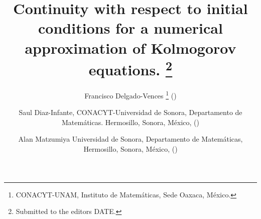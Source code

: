 \usepackage{lipsum}
\usepackage{amsfonts}
\usepackage{amsmath, amssymb}
\usepackage{graphicx}
\usepackage{epstopdf}
\usepackage{algorithmic}
\DeclareMathOperator{\sech}{sech}
\ifpdf
\else
\fi
\newcommand{\creflastconjunction}{, and~}

\title{
    Continuity with respect to initial conditions for a numerical 
    approximation of Kolmogorov equations.
    \thanks{
        Submitted to the editors DATE.
    }
}

\author{
    Francisco Delgado-Vences
    \thanks{
    CONACYT-UNAM, 
    Instituto de Matem\'aticas, 
    Sede Oaxaca, M\'exico.}
    ()
%    
    \and
    Saul Diaz-Infante,
    CONACYT-Universidad 
    de Sonora, Departamento de Matem\'aticas. 
    Hermosillo, Sonora, M\'exico,
    ()
%
    \and
    Alan Matzumiya
    Universidad de Sonora, 
    Departamento de Matem\'aticas,
    Hermosillo, Sonora, M\'exico,
    ()
    \footnotemark[3]
}

\usepackage{amsopn}
\DeclareMathOperator{\diag}{diag}

\newcommand{\cqd}{\hfill$\Box$}
\newcommand{\f}{{\mathcal F}}
\newcommand{\IR}{{\mathbb R}}
\newcommand{\R}{{\mathbb R}}
\newcommand{\IN}{{\mathbb N}}
\newcommand{\ind}{\mbox{\Large$\chi$}}
\newcommand{\tor}{{\mathbb T}}
\newcommand{\G}{{\mathbb G}}
\newcommand{\beq}{\begin{equation}}
\newcommand{\eeq}{\end{equation}}
\newcommand{\bal}{\begin{align}}
\newcommand{\eal}{\end{align}}
\newcommand{\beqn}{\begin{equation*}}
\newcommand{\eeqn}{\end{equation*}}
\newcommand{\baln}{\begin{align*}}
\newcommand{\ealn}{\end{align*}}
\newcommand{\tbar}{\bar t}
\newcommand{\xbar}{\bar x}
\newcommand{\ep}{\epsilon}
\newcommand{\Pb}{\mathbb P}
\newcommand{\Rl}{\mathbb R}
\newcommand{\E}{\mathbb{E}}
\newcommand{\tf}{\mathcal{F}}
\newcommand{\hac}{\mathcal{H}}
\newcommand{\hact}{\mathcal{H}_T}
